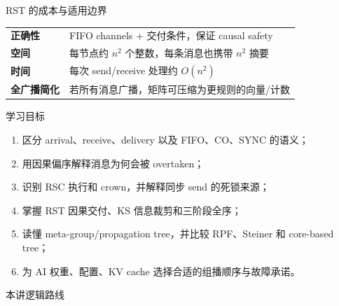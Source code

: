 \documentclass[UTF8,fontset=none,aspectratio=169,10pt]{beamer}
\begin{document}
{\begin{frame}{RST 的成本与适用边界}
\begin{tabularx}{\linewidth}{>{\bfseries}p{3.3cm}X}
\toprule
正确性 & FIFO channels + 交付条件，保证 causal safety \\
空间 & 每节点约 $n^2$ 个整数，每条消息也携带 $n^2$ 摘要 \\
时间 & 每次 send/receive 处理约 $O(n^2)$ \\
全广播简化 & 若所有消息广播，矩阵可压缩为更规则的向量/计数 \\
\bottomrule
\end{tabularx}
\vfill
{}
\end{frame}


\begin{frame}{学习目标}
\begin{enumerate}
  \item 区分 arrival、receive、delivery 以及 FIFO、CO、SYNC 的语义；
  \item 用因果偏序解释消息为何会被 overtaken；
  \item 识别 RSC 执行和 crown，并解释同步 send 的死锁来源；
  \item 掌握 RST 因果交付、KS 信息裁剪和三阶段全序；
  \item 读懂 meta-group/propagation tree，并比较 RPF、Steiner 和 core-based tree；
  \item 为 AI 权重、配置、KV cache 选择合适的组播顺序与故障承诺。
\end{enumerate}
\vfill
{}
\end{frame}

\begin{frame}{本讲逻辑路线}
\begin{center}
\end{center}
\vfill
{}
\end{frame}

}
\end{document}
